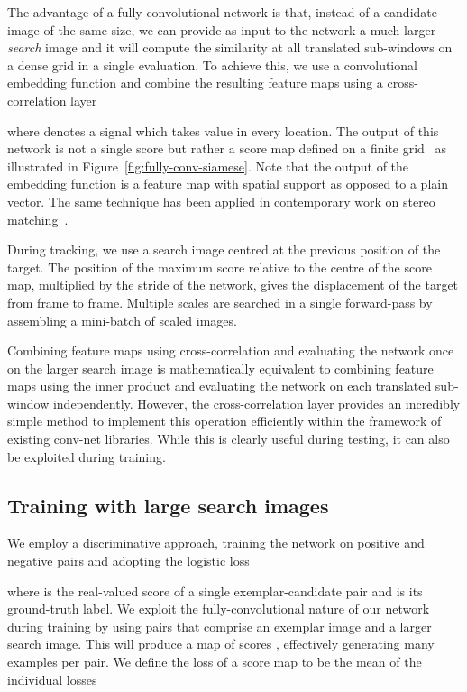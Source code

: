 The advantage of a fully-convolutional network is that, instead of a candidate image of the same size, we can provide as input to the network a much larger \emph{search} image and it will compute the similarity at all translated sub-windows on a dense grid in a single evaluation.
To achieve this, we use a convolutional embedding function  and combine the resulting feature maps using a cross-correlation layer

where  denotes a signal which takes value  in every location.
The output of this network is not a single score but rather a score map defined on a finite grid~ as illustrated in Figure~\ref{fig:fully-conv-siamese}.
Note that the output of the embedding function is a feature map with spatial support as opposed to a plain vector.
The same technique has been applied in contemporary work on stereo matching~\cite{luo2016efficient}.

During tracking, we use a search image centred at the previous position of the target.
The position of the maximum score relative to the centre of the score map, multiplied by the stride of the network, gives the displacement of the target from frame to frame.
Multiple scales are searched in a single forward-pass by assembling a mini-batch of scaled images.

Combining feature maps using cross-correlation and evaluating the network once on the larger search image is mathematically equivalent to combining feature maps using the inner product and evaluating the network on each translated sub-window independently.
However, the cross-correlation layer provides an incredibly simple method to implement this operation efficiently within the framework of existing conv-net libraries.
While this is clearly useful during testing, it can also be exploited during training.


\subsection{Training with large search images\label{sec:training}}

We employ a discriminative approach, training the network on positive and negative pairs and adopting the logistic loss

where  is the real-valued score of a single exemplar-candidate pair and  is its ground-truth label.
We exploit the fully-convolutional nature of our network during training by using pairs that comprise an exemplar image and a larger search image.
This will produce a map of scores , effectively generating many examples per pair.
We define the loss of a score map to be the mean of the individual losses

